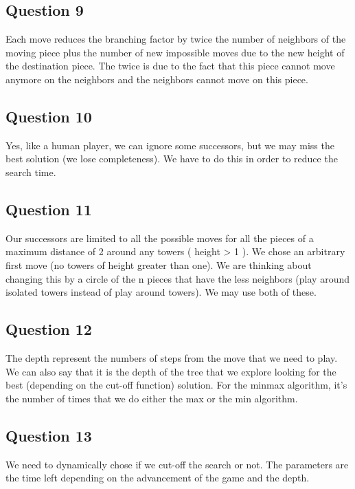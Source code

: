 \documentclass[10pt]{report}
\begin{document}
\subsection*{Question 9}
Each move reduces the branching factor by twice the number of neighbors of the moving piece plus the number of new impossible moves due to the new height of the destination piece. The twice is due to the fact that this piece cannot move anymore on the neighbors and the neighbors cannot move on this piece.

\subsection*{Question 10}

Yes, like a human player, we can ignore some successors, but we may miss the best solution (we lose completeness). We have to do this in order to reduce the search time.


\subsection*{Question 11}
Our successors are limited to all the possible moves for all the pieces of a maximum distance of 2 around any towers ( height > 1 ). We chose an arbitrary first move (no towers of height greater than one). We are thinking about changing this by a circle of the n pieces that have the less neighbors (play around isolated towers instead of play around towers). We may use both of these.

\subsection*{Question 12}
The depth represent the numbers of steps from the move that we need to play. We can also say that it is the depth of the tree that we explore looking for the best (depending on the cut-off function) solution. For the minmax algorithm, it's the number of times that we do either the max or the min algorithm.

\subsection*{Question 13}
We need to dynamically chose if we cut-off the search or not. The parameters are the time left depending on the advancement of the game and the depth.
\end{document}
